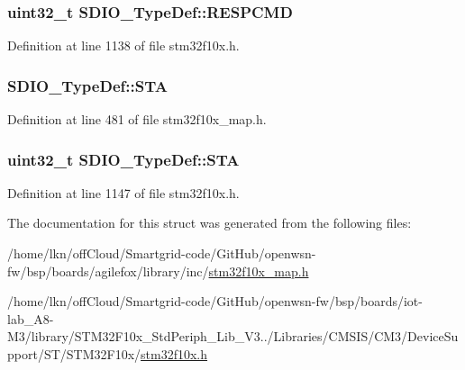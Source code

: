 \subsubsection[{\texorpdfstring{R\+E\+S\+P\+C\+MD}{RESPCMD}}]{ {\bf uint32\+\_\+t} S\+D\+I\+O\+\_\+\+Type\+Def\+::\+R\+E\+S\+P\+C\+MD}\hypertarget{struct_s_d_i_o___type_def_a9d881ed6c2fdecf77e872bcc6b404774}{}\label{struct_s_d_i_o___type_def_a9d881ed6c2fdecf77e872bcc6b404774}


Definition at line 1138 of file stm32f10x.\+h.

\subsubsection[{\texorpdfstring{S\+TA}{STA}}]{ S\+D\+I\+O\+\_\+\+Type\+Def\+::\+S\+TA}\hypertarget{struct_s_d_i_o___type_def_a1e9a425e495cf17c54bb5a4f30d5665d}{}\label{struct_s_d_i_o___type_def_a1e9a425e495cf17c54bb5a4f30d5665d}


Definition at line 481 of file stm32f10x\+\_\+map.\+h.

\subsubsection[{\texorpdfstring{S\+TA}{STA}}]{ {\bf uint32\+\_\+t} S\+D\+I\+O\+\_\+\+Type\+Def\+::\+S\+TA}\hypertarget{struct_s_d_i_o___type_def_a6b917b09c127e77bd3128bbe19a00499}{}\label{struct_s_d_i_o___type_def_a6b917b09c127e77bd3128bbe19a00499}


Definition at line 1147 of file stm32f10x.\+h.



The documentation for this struct was generated from the following files\+:\begin{DoxyCompactItemize}
\item 
/home/lkn/off\+Cloud/\+Smartgrid-\/code/\+Git\+Hub/openwsn-\/fw/bsp/boards/agilefox/library/inc/\hyperlink{agilefox_2library_2inc_2stm32f10x__map_8h}{stm32f10x\+\_\+map.\+h}\item 
/home/lkn/off\+Cloud/\+Smartgrid-\/code/\+Git\+Hub/openwsn-\/fw/bsp/boards/iot-\/lab\+\_\+\+A8-\/\+M3/library/\+S\+T\+M32\+F10x\+\_\+\+Std\+Periph\+\_\+\+Lib\+\_\+\+V3../\+Libraries/\+C\+M\+S\+I\+S/\+C\+M3/\+Device\+Support/\+S\+T/\+S\+T\+M32\+F10x/\hyperlink{iot-lab___a8-_m3_2library_2_s_t_m32_f10x___std_periph___lib___v3_85_80_2_libraries_2_c_m_s_i_s_26497265545392eb5694b064ae15018db}{stm32f10x.\+h}\end{DoxyCompactItemize}
